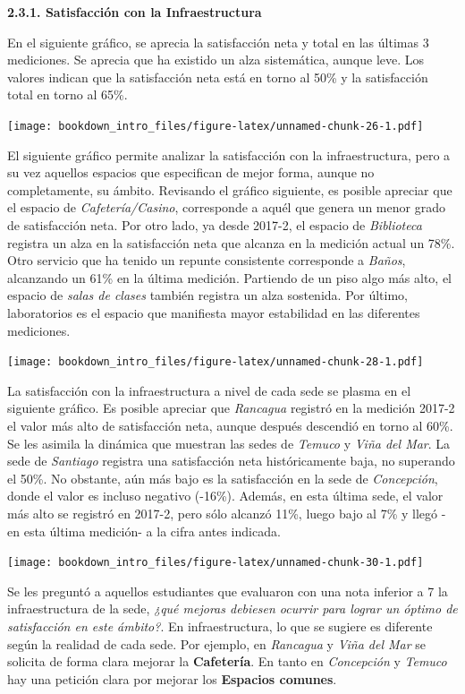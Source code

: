 \documentclass[]{book}
\begin{document}
\textbf{2.3.1. Satisfacción con la Infraestructura}

En el siguiente gráfico, se aprecia la satisfacción neta y total en las
últimas 3 mediciones. Se aprecia que ha existido un alza sistemática,
aunque leve. Los valores indican que la satisfacción neta está en torno
al 50\% y la satisfacción total en torno al 65\%.

\texttt{[image: bookdown\_intro\_files/figure-latex/unnamed-chunk-26-1.pdf]}

El siguiente gráfico permite analizar la satisfacción con la
infraestructura, pero a su vez aquellos espacios que especifican de
mejor forma, aunque no completamente, su ámbito. Revisando el gráfico
siguiente, es posible apreciar que el espacio de
\emph{Cafetería/Casino}, corresponde a aquél que genera un menor grado
de satisfacción neta. Por otro lado, ya desde 2017-2, el espacio de
\emph{Biblioteca} registra un alza en la satisfacción neta que alcanza
en la medición actual un 78\%. Otro servicio que ha tenido un repunte
consistente corresponde a \emph{Baños}, alcanzando un 61\% en la última
medición. Partiendo de un piso algo más alto, el espacio de \emph{salas
de clases} también registra un alza sostenida. Por último, laboratorios
es el espacio que manifiesta mayor estabilidad en las diferentes
mediciones.

\texttt{[image: bookdown\_intro\_files/figure-latex/unnamed-chunk-28-1.pdf]}

La satisfacción con la infraestructura a nivel de cada sede se plasma en
el siguiente gráfico. Es posible apreciar que \emph{Rancagua} registró
en la medición 2017-2 el valor más alto de satisfacción neta, aunque
después descendió en torno al 60\%. Se les asimila la dinámica que
muestran las sedes de \emph{Temuco} y \emph{Viña del Mar}. La sede de
\emph{Santiago} registra una satisfacción neta históricamente baja, no
superando el 50\%. No obstante, aún más bajo es la satisfacción en la
sede de \emph{Concepción}, donde el valor es incluso negativo (-16\%).
Además, en esta última sede, el valor más alto se registró en 2017-2,
pero sólo alcanzó 11\%, luego bajo al 7\% y llegó -en esta última
medición- a la cifra antes indicada.

\texttt{[image: bookdown\_intro\_files/figure-latex/unnamed-chunk-30-1.pdf]}

Se les preguntó a aquellos estudiantes que evaluaron con una nota
inferior a 7 la infraestructura de la sede, \emph{¿qué mejoras debiesen
ocurrir para lograr un óptimo de satisfacción en este ámbito?}. En
infraestructura, lo que se sugiere es diferente según la realidad de
cada sede. Por ejemplo, en \emph{Rancagua} y \emph{Viña del Mar} se
solicita de forma clara mejorar la \textbf{Cafetería}. En tanto en
\emph{Concepción} y \emph{Temuco} hay una petición clara por mejorar los
\textbf{Espacios comunes}.
\end{document}
